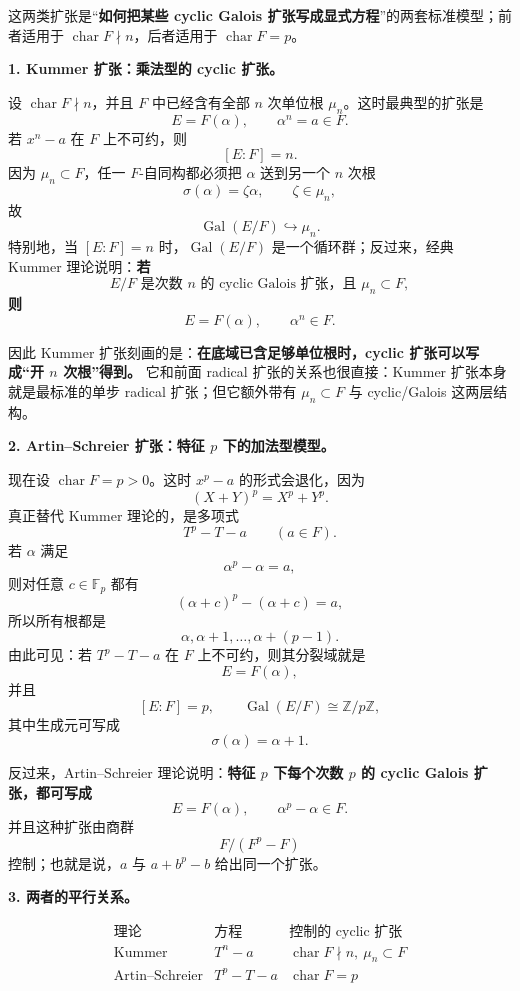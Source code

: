 \documentclass[a4paper]{ctexart}
\theoremstyle{definition}
\theoremstyle{analysis}
\theoremstyle{plain}
\begin{document}
这两类扩张是“\textbf{如何把某些 cyclic Galois 扩张写成显式方程}”的两套标准模型；前者适用于
\(\operatorname{char}F\nmid n\)，后者适用于 \(\operatorname{char}F=p\)。

\medskip

\textbf{1. Kummer 扩张：乘法型的 cyclic 扩张。}

设 \(\operatorname{char}F\nmid n\)，并且 \(F\) 中已经含有全部 \(n\) 次单位根 \(\mu_n\)。这时最典型的扩张是
\[
  E=F(\alpha),\qquad \alpha^n=a\in F.
\]
若 \(x^n-a\) 在 \(F\) 上不可约，则
\[
  [E:F]=n.
\]
因为 \(\mu_n\subset F\)，任一 \(F\)-自同构都必须把 \(\alpha\) 送到另一个 \(n\) 次根
\[
  \sigma(\alpha)=\zeta\alpha,\qquad \zeta\in \mu_n,
\]
故
\[
  \operatorname{Gal}(E/F)\hookrightarrow \mu_n.
\]
特别地，当 \([E:F]=n\) 时，\(\operatorname{Gal}(E/F)\) 是一个循环群；反过来，经典 Kummer 理论说明：\textbf{若}
\[
  E/F \text{ 是次数 }n\text{ 的 cyclic Galois 扩张，且 }\mu_n\subset F,
\]
\textbf{则}
\[
  E=F(\alpha),\qquad \alpha^n\in F.
\]

因此 Kummer 扩张刻画的是：\textbf{在底域已含足够单位根时，cyclic 扩张可以写成“开 \(n\) 次根”得到。}
它和前面 radical 扩张的关系也很直接：Kummer 扩张本身就是最标准的单步 radical 扩张；但它额外带有
\(\mu_n\subset F\) 与 cyclic/Galois 这两层结构。

\medskip

\textbf{2. Artin--Schreier 扩张：特征 \(p\) 下的加法型模型。}

现在设 \(\operatorname{char}F=p>0\)。这时 \(x^p-a\) 的形式会退化，因为
\[
  (X+Y)^p=X^p+Y^p.
\]
真正替代 Kummer 理论的，是多项式
\[
  T^p-T-a\qquad (a\in F).
\]
若 \(\alpha\) 满足
\[
  \alpha^p-\alpha=a,
\]
则对任意 \(c\in \mathbb F_p\) 都有
\[
  (\alpha+c)^p-(\alpha+c)=a,
\]
所以所有根都是
\[
  \alpha,\alpha+1,\dots,\alpha+(p-1).
\]
由此可见：若 \(T^p-T-a\) 在 \(F\) 上不可约，则其分裂域就是
\[
  E=F(\alpha),
\]
并且
\[
  [E:F]=p,\qquad \operatorname{Gal}(E/F)\cong \mathbb Z/p\mathbb Z,
\]
其中生成元可写成
\[
  \sigma(\alpha)=\alpha+1.
\]

反过来，Artin--Schreier 理论说明：\textbf{特征 \(p\) 下每个次数 \(p\) 的 cyclic Galois 扩张，都可写成}
\[
  E=F(\alpha),\qquad \alpha^p-\alpha\in F.
\]
并且这种扩张由商群
\[
  F/(F^p-F)
\]
控制；也就是说，\(a\) 与 \(a+b^p-b\) 给出同一个扩张。

\medskip

\textbf{3. 两者的平行关系。}

\[
  \begin{array}{c|c|c}
    \text{理论} & \text{方程} & \text{控制的 cyclic 扩张} \\
    \hline
    \text{Kummer} & T^n-a & \operatorname{char}F\nmid n,\ \mu_n\subset F \\
    \text{Artin--Schreier} & T^p-T-a & \operatorname{char}F=p
  \end{array}
\]
\end{document}
